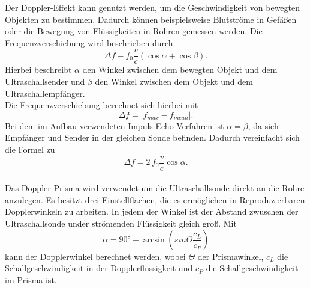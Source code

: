 Der Doppler-Effekt kann genutzt werden, um die Geschwindigkeit von bewegten Objekten zu bestimmen.
Dadurch können beispielsweise Blutströme in Gefäßen oder die Bewegung von Flüssigkeiten in Rohren gemessen werden.
Die Frequenzverschiebung wird beschrieben durch
\begin{equation*}
    Δf - f_0 \frac{v}{c} \left(\cos{α} + \cos{β}\right).
\end{equation*}%
Hierbei beschreibt $α$ den Winkel zwischen dem bewegten Objekt und dem Ultraschallsender und $β$ den Winkel zwischen dem Objekt 
und dem Ultraschallempfänger.\\
Die Frequenzverschiebung berechnet sich hierbei mit 
\begin{equation}\label{eq:f_ver}
    \Delta f = |f_{max} - f_{mean}|.
\end{equation}
Bei dem im Aufbau verwendeten Impuls-Echo-Verfahren ist $α = β$, da sich Empfänger und Sender in der gleichen Sonde befinden. Dadurch vereinfacht sich die Formel zu 
\begin{equation}\label{eq:Frequenzverschiebung}
    Δf = 2\, f_0 \frac{v}{c} \cos{α}.
\end{equation}
\\
Das Doppler-Prisma wird verwendet um die Ultraschallsonde direkt an die Rohre anzulegen.
Es besitzt drei Einstellflächen, die es ermöglichen in Reproduzierbaren Dopplerwinkeln zu arbeiten.
In jedem der Winkel ist der Abstand zwuschen der Ultraschallsonde under strömenden Flüssigkeit gleich groß.
Mit 
\begin{equation}\label{eq:Dopplerwinkel}
    α = 90° - \arcsin{\left(sin{Θ}\frac{c_L}{c_P}\right)}
\end{equation}
kann der Dopplerwinkel berechnet werden, wobei $Θ$ der Prismawinkel, $c_L$ die Schallgeschwindigkeit in der Dopplerflüssigkeit und $c_P$ die Schallgeschwindigkeit im Prisma ist.
